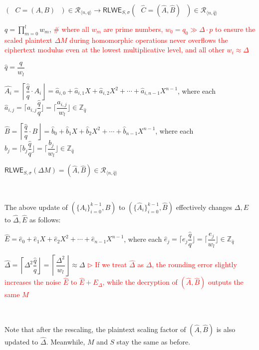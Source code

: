 $(\text{ }C = (A, B)\text{ }) \in \mathcal{R}_{\langle n, q \rangle} \rightarrow \textsf{RLWE}_{S, \sigma}(\text{ }\hat{C} = (\hat{A}, \hat{B})\text{ }) \in \mathcal{R}_{\langle n, \hat q \rangle}$ 


$q = \prod\limits_{m=0}^{l}w_m$, \textcolor{red}{ \text{ } \# where all $w_m$ are prime numbers,  $w_0 = q_0 \gg \Delta\cdot p$ to ensure the scaled plaintext $\Delta M$ during homomorphic operations never overflows the ciphertext modulus even at the lowest multiplicative level, and all other $w_i \approx \Delta$}

$\hat{q} = \dfrac{q}{w_l}$

$\hat{A_i} = \left\lceil\dfrac{\hat q}{q}\cdot A_i\right\rfloor = \hat{a}_{i,0} + \hat{a}_{i,1}X + \hat{a}_{i,2}X^2 + \cdots + \hat{a}_{i, {n-1}}X^{n-1}$, where each $\hat{a}_{i,j} = \Big\lceil a_{i,j}\dfrac{\hat{q}}{q} \Big\rfloor = \Big\lceil \dfrac{a_{i,j}}{w_l} \Big\rfloor \in \mathbb{Z}_{\hat{q}}$ 


$\hat{B} = \left\lceil\dfrac{\hat q}{q}\cdot B\right\rfloor = \hat{b}_0 + \hat{b}_1X + \hat{b}_2X^2 + \cdots + \hat{b}_{n-1}X^{n-1}$, where each $\hat{b}_j = \Big\lceil b_j\dfrac{\hat{q}}{q} \Big\rfloor = \Big\lceil \dfrac{b_j}{w_l} \Big\rfloor \in \mathbb{Z}_{\hat{q}}$


$\textsf{RLWE}_{{S},\sigma}(\Delta  M) = (\hat{A}, \hat{B}) \in \mathcal{R}_{\langle n, \hat{q} \rangle}$ 


$ $

The above update of $(\{A_i\}_{i=0}^{k-1}, B)$ to $(\{\hat{A}_i\}_{i=0}^{k-1}, \hat B)$ effectively changes $\Delta, E$ to $\hat\Delta, \hat E$ as follows:

$\hat{E} = \hat{e}_0 + \hat{e}_1X + \hat{e}_2X^2 + \cdots + \hat{e}_{n-1}X^{n-1}$, where each $\hat{e}_j = \Big\lceil e_j\dfrac{\hat{q}}{q} \Big\rfloor = \Big\lceil \dfrac{e_j}{w_l} \Big\rfloor \in \mathbb{Z}_{\hat{q}}$

$\hat{\Delta} = \left\lceil\Delta^2\dfrac{\hat{q}}{q}\right\rfloor = \left\lceil\dfrac{\Delta^2}{w_l}\right\rfloor \approx \Delta$ \textcolor{red}{ $\rhd$ If we treat $\hat\Delta$ as $\Delta$, the rounding error slightly increases the noise $\hat E$ to $\hat E + E_\Delta$, while the decryption of $(\hat A, \hat B)$ outputs the same $M$}

$ $

Note that after the rescaling, the plaintext scaling factor of $(\hat A, \hat B)$ is also updated to $\hat{\Delta}$. Meanwhile, $M$ and $S$ stay the same as before.

